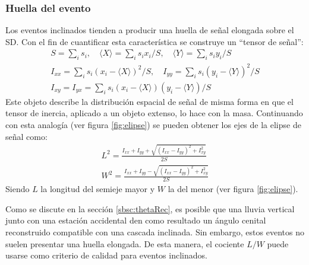 		\subsubsection{Huella del evento}
		Los eventos inclinados tienden a producir una huella de señal elongada sobre el SD.
		Con el fin de cuantificar esta característica se construye un ``tensor de señal'':
		\begin{eqnarray}
		S = \sum_i s_i, \quad \langle X \rangle = \sum_i s_i x_i/S, \quad \langle Y \rangle = \sum_i s_i y_i/S \nonumber \\
		I_{xx} = \sum_i s_i (x_i - \langle X \rangle)^2 / S, \quad I_{yy} = \sum_i s_i (y_i - \langle Y \rangle)^2 / S \nonumber \\
		I_{xy} = I_{yx} = \sum_i s_i (x_i - \langle X \rangle)(y_i - \langle Y \rangle) / S 
		\end{eqnarray}
		Este objeto describe la distribución espacial de señal de misma forma en que el tensor de inercia, aplicado a un objeto extenso, lo hace con la masa.
		Continuando con esta analogía (ver figura \ref{fig:elipse}) se pueden obtener los ejes de la elipse de señal como:
		\begin{eqnarray}
		L^2 =\frac{I_{xx}+I_{yy}+\sqrt{(I_{xx}-I_{yy})^2 + I_{xy}^2 }}{2S} \nonumber\\
		W^2 =\frac{I_{xx}+I_{yy}-\sqrt{(I_{xx}-I_{yy})^2 + I_{xy}^2 }}{2S} 
		\end{eqnarray}
		Siendo $L$ la longitud del semieje mayor y $W$ la del menor (ver figura \ref{fig:elipse}).

		Como se discute en la sección \ref{sbsc:thetaRec}, es posible que una lluvia vertical junto con una estación accidental den como resultado un ángulo cenital reconstruido compatible con una cascada inclinada.
		Sin embargo, estos eventos no suelen presentar una huella elongada.
		De esta manera, el cociente $L/W$ puede usarse como criterio de calidad para eventos inclinados.
		
